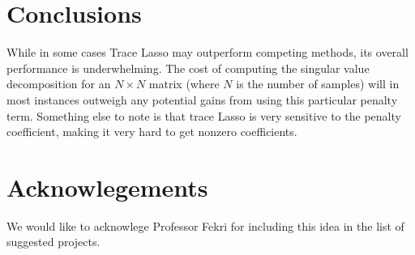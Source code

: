 \documentclass[11pt]{article}
\begin{document}
\section{Conclusions}
While in some cases Trace Lasso may outperform competing methods, its overall performance is underwhelming. The cost of computing the singular value decomposition for an $N\times N$ matrix (where $N$ is the number of samples) will in most instances outweigh any potential gains from using this particular penalty term. Something else to note is that trace Lasso is very sensitive to the penalty coefficient, making it very hard to get nonzero coefficients.
\section{Acknowlegements}
We would like to acknowlege Professor Fekri for including this idea in the list of suggested projects.

{}

\end{document}
